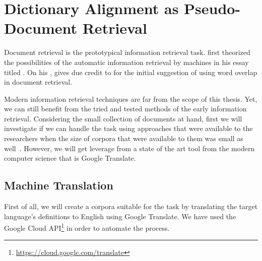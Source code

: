 
\chapter{Dictionary Alignment as Pseudo-Document Retrieval}%
\label{chap:retrieval}

Document retrieval is the prototypical information retrieval task.
\textcite{bush_as_1945} first theorized the possibilities of the automatic information retrieval by machines in his essay titled .
On his , \textcite{singhal_modern_2001} gives due credit to \textcite{luhn_statistical_1957} for the initial suggestion of using word overlap in document retrieval.

Modern information retrieval techniques are far from the scope of this thesis.
Yet, we can still benefit from the tried and tested methods of the early information retrieval.
Considering the small collection of documents at hand, first we will investigate if we can handle the task using approaches that were available to the researchers when the size of corpora that were available to them was small as well~\cite{singhal_modern_2001}.
However, we will get leverage from a state of the art tool from the modern computer science that is Google Translate.

\section{Machine Translation}

First of all, we will create a corpora suitable for the task by translating the target language's definitions to English using Google Translate.
We have used the Google Cloud API\footnote{\url{https://cloud.google.com/translate}} in order to automate the process.

